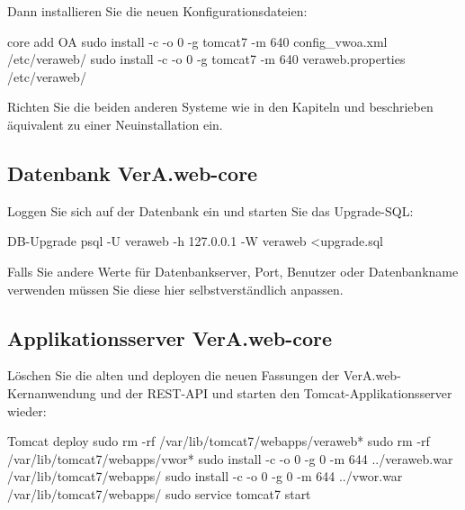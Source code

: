 \begin{minipage}{\textwidth}
Dann installieren Sie die neuen Konfigurationsdateien:

\begin{lstdump}{core add OA}
sudo install -c -o 0 -g tomcat7 -m 640 config_vwoa.xml /etc/veraweb/
sudo install -c -o 0 -g tomcat7 -m 640 veraweb.properties /etc/veraweb/
\end{lstdump}
\end{minipage}

Richten Sie die beiden anderen Systeme wie in den Kapiteln
 und  beschrieben
äquivalent zu einer Neuinstallation ein.

\fi\fi%

\subsection{Datenbank VerA.web-core}\label{subsec:upgrade-core-db}

\begin{minipage}{\textwidth}
Loggen Sie sich auf der Datenbank ein und starten Sie das Upgrade-SQL:

\begin{lstdump}{DB-Upgrade}
psql -U veraweb -h 127.0.0.1 -W veraweb <upgrade.sql
\end{lstdump}

Falls Sie andere Werte für Datenbankserver, Port, Benutzer oder Datenbankname
verwenden müssen Sie diese hier selbstverständlich anpassen.
\end{minipage}

\subsection{Applikationsserver VerA.web-core}\label{subsec:upgrade-core-tomcat}

\begin{minipage}{\textwidth}
Löschen Sie die alten und deployen die neuen Fassungen der
VerA.web-Kernanwendung und der REST-API und starten den
Tomcat-Applikationsserver wieder:

\begin{lstdump}{Tomcat deploy}
sudo rm -rf /var/lib/tomcat7/webapps/veraweb*
sudo rm -rf /var/lib/tomcat7/webapps/vwor*
sudo install -c -o 0 -g 0 -m 644 ../veraweb.war /var/lib/tomcat7/webapps/
sudo install -c -o 0 -g 0 -m 644 ../vwor.war /var/lib/tomcat7/webapps/
sudo service tomcat7 start
\end{lstdump}
\end{minipage}

